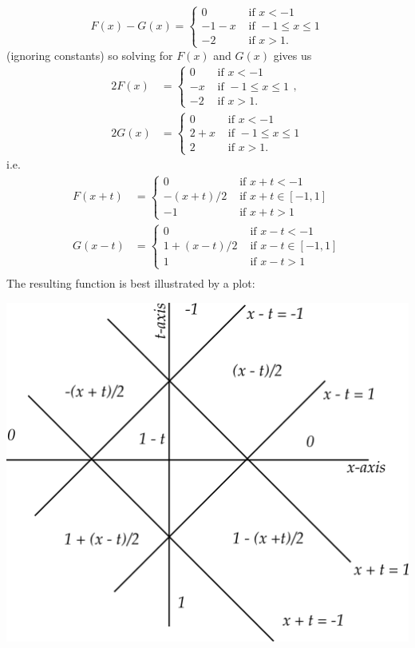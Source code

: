 \documentclass[12pt]{article}
\begin{document}
\begin{answer}
\begin{enumerate}[(a)]
\[F(x)-G(x)=\begin{cases}
0&\mbox{ if }x<-1\\
-1-x&\mbox{ if }-1\leq x\leq 1\\
-2&\mbox{ if }x>1.
\end{cases}\]
(ignoring constants) so solving for $F(x)$ and $G(x)$ gives us
\begin{align*}
2F(x)&=\begin{cases}
0&\mbox{ if }x<-1\\
-x&\mbox{ if }-1\leq x\leq 1\\
-2&\mbox{ if }x>1.
\end{cases},\\
2G(x)&=\begin{cases}
0&\mbox{ if }x<-1\\
2+x&\mbox{ if }-1\leq x\leq 1\\
2&\mbox{ if }x>1.
\end{cases}
\end{align*}
i.e.
\begin{align*}
F(x+t)&=\begin{cases}0&\mbox{ if }x+t<-1\\
-(x+t)/2&\mbox{ if }x+t\in[-1,1]\\
-1&\mbox{ if }x+t>1
\end{cases}\\
G(x-t)&=\begin{cases}0&\mbox{ if }x-t<-1\\
1+(x-t)/2&\mbox{ if }x-t\in[-1,1]\\
1&\mbox{ if }x-t>1
\end{cases}\\
\end{align*}
The resulting function is best illustrated by a plot:
\begin{center}
\includegraphics{qun-sh7-1d.png}
\end{center}
\end{enumerate}
\end{answer}
\newpage
\end{document}
